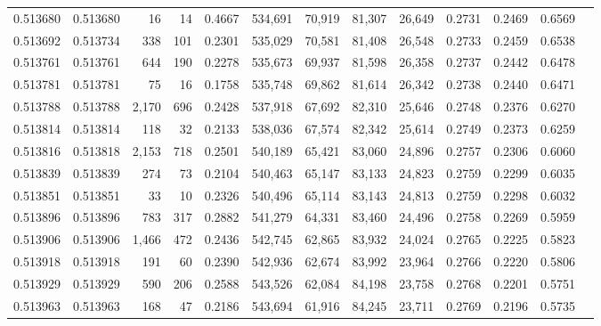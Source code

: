 \begin{tabular}{rrrrrrrrrrrrr}
0.513680 & 0.513680 &    16 &    14 &                                     0.4667 & 534,691 &  70,919 &  81,307 &  26,649 & 0.2731 & 0.2469 & 0.6569 \\
0.513692 & 0.513734 &   338 &   101 &                                     0.2301 & 535,029 &  70,581 &  81,408 &  26,548 & 0.2733 & 0.2459 & 0.6538 \\
0.513761 & 0.513761 &   644 &   190 &                                     0.2278 & 535,673 &  69,937 &  81,598 &  26,358 & 0.2737 & 0.2442 & 0.6478 \\
0.513781 & 0.513781 &    75 &    16 &                                     0.1758 & 535,748 &  69,862 &  81,614 &  26,342 & 0.2738 & 0.2440 & 0.6471 \\
0.513788 & 0.513788 & 2,170 &   696 &                                     0.2428 & 537,918 &  67,692 &  82,310 &  25,646 & 0.2748 & 0.2376 & 0.6270 \\
0.513814 & 0.513814 &   118 &    32 &                                     0.2133 & 538,036 &  67,574 &  82,342 &  25,614 & 0.2749 & 0.2373 & 0.6259 \\
0.513816 & 0.513818 & 2,153 &   718 &                                     0.2501 & 540,189 &  65,421 &  83,060 &  24,896 & 0.2757 & 0.2306 & 0.6060 \\
0.513839 & 0.513839 &   274 &    73 &                                     0.2104 & 540,463 &  65,147 &  83,133 &  24,823 & 0.2759 & 0.2299 & 0.6035 \\
0.513851 & 0.513851 &    33 &    10 &                                     0.2326 & 540,496 &  65,114 &  83,143 &  24,813 & 0.2759 & 0.2298 & 0.6032 \\
0.513896 & 0.513896 &   783 &   317 &                                     0.2882 & 541,279 &  64,331 &  83,460 &  24,496 & 0.2758 & 0.2269 & 0.5959 \\
0.513906 & 0.513906 & 1,466 &   472 &                                     0.2436 & 542,745 &  62,865 &  83,932 &  24,024 & 0.2765 & 0.2225 & 0.5823 \\
0.513918 & 0.513918 &   191 &    60 &                                     0.2390 & 542,936 &  62,674 &  83,992 &  23,964 & 0.2766 & 0.2220 & 0.5806 \\
0.513929 & 0.513929 &   590 &   206 &                                     0.2588 & 543,526 &  62,084 &  84,198 &  23,758 & 0.2768 & 0.2201 & 0.5751 \\
0.513963 & 0.513963 &   168 &    47 &                                     0.2186 & 543,694 &  61,916 &  84,245 &  23,711 & 0.2769 & 0.2196 & 0.5735 \\

\end{tabular}
